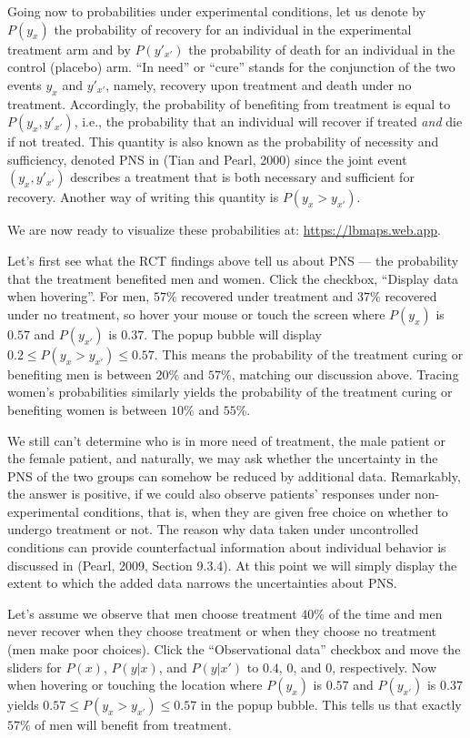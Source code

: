 \documentclass{article}
\begin{document}
Going now to probabilities under experimental conditions, let us denote by $P(y_x)$ the probability of recovery for an individual in the experimental treatment arm and by $P(y'_{x'})$ the probability of death for an individual in the control (placebo) arm. ``In need'' or ``cure'' stands for the conjunction of the two events $y_x$ and $y'_{x'}$, namely, recovery upon treatment and death under no treatment. Accordingly, the probability of benefiting from treatment is equal to $P(y_x, y'_{x'})$, i.e., the probability that an individual will recover if treated \emph{and} die if not treated. This quantity is also known as the probability of necessity and sufficiency, denoted PNS in (Tian and Pearl, 2000\citep{tianpearl2000}) since the joint event $(y_x, y'_{x'})$ describes a treatment that is both necessary and sufficient for recovery. Another way of writing this quantity is $P(y_x > y_{x'})$.

We are now ready to visualize these probabilities at: \url{https://lbmaps.web.app}.

Let's first see what the RCT findings above tell us about PNS --- the probability that the treatment benefited men and women. Click the checkbox, ``Display data when hovering''. For men, $57\%$ recovered under treatment and $37\%$ recovered under no treatment, so hover your mouse or touch the screen where $P(y_x)$ is $0.57$ and $P(y_{x'})$ is $0.37$. The popup bubble will display $0.2 \leqslant P(y_x > y_{x'}) \leqslant 0.57$. This means the probability of the treatment curing or benefiting men is between $20\%$ and $57\%$, matching our discussion above. Tracing women's probabilities similarly yields the probability of the treatment curing or benefiting women is between $10\%$ and $55\%$.

We still can't determine who is in more need of treatment, the male patient or the female patient, and naturally, we may ask whether the uncertainty in the PNS of the two groups can somehow be reduced by additional data. Remarkably, the answer is positive, if we could also observe patients' responses under non-experimental conditions, that is, when they are given free choice on whether to undergo treatment or not. The reason why data taken under uncontrolled conditions can provide counterfactual information about individual behavior is discussed in (Pearl, 2009, Section 9.3.4\citep{pearl2009}). At this point we will simply display the extent to which the added data narrows the uncertainties about PNS.

Let's assume we observe that men choose treatment $40\%$ of the time and men never recover when they choose treatment or when they choose no treatment (men make poor choices). Click the ``Observational data'' checkbox and move the sliders for $P(x)$, $P(y|x)$, and $P(y|x')$ to $0.4$, $0$, and $0$, respectively. Now when hovering or touching the location where $P(y_x)$ is $0.57$ and $P(y_{x'})$ is $0.37$ yields $0.57 \leqslant P(y_x > y_{x'}) \leqslant 0.57$ in the popup bubble. This tells us that exactly $57\%$ of men will benefit from treatment.
\end{document}
